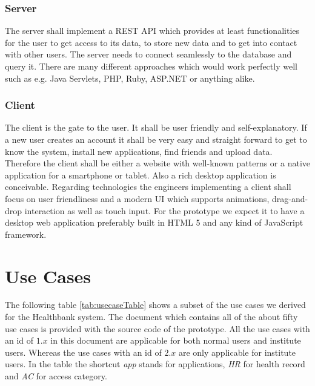 \subsubsection{Server}

The server shall implement a REST API which provides at least functionalities for the user to get access to its data, to store new data and to get into contact with other users. The server needs to connect seamlessly to the database and query it. There are many different approaches which would work perfectly well such as e.g. Java Servlets, PHP, Ruby, ASP.NET or anything alike. 


\subsubsection{Client}

The client is the gate to the user. It shall be user friendly and self-explanatory. If a new user creates an account it shall be very easy and straight forward to get to know the system, install new applications, find friends and upload data. Therefore the client shall be either a website with well-known patterns or a native application for a smartphone or tablet. Also a rich desktop application is conceivable. Regarding technologies the engineers implementing a client shall focus on user friendliness and a modern UI which supports animations, drag-and-drop interaction as well as touch input. For the prototype we expect it to have a desktop web application preferably built in HTML 5 and any kind of JavaScript framework.

 

\section{Use Cases} 
\label{usecase}

The following table \ref{tab:usecaseTable} shows a subset of the use cases we derived for the Healthbank system. The document which contains all of the about fifty use cases is provided with the source code of the prototype. All the use cases with an id of $1.x$ in this document are applicable for both normal users and institute users. Whereas the use cases with an id of $2.x$ are only applicable for institute
users. In the table the shortcut \emph{app} stands for applications, \emph{HR} for health record and \emph{AC} for access category.
\newpage


